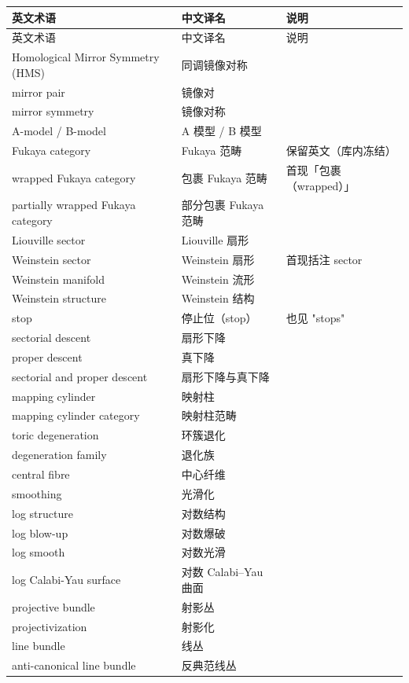 \documentclass[11pt,a4paper]{article}
\theoremstyle{cnth}
\begin{document}
{\small
\begin{longtable}{p{5.0cm}p{5.6cm}p{3.6cm}}
\toprule
英文术语 & 中文译名 & 说明 \\
\midrule
\endfirsthead
\toprule
英文术语 & 中文译名 & 说明 \\
\midrule
\endhead
\bottomrule
\endfoot
Homological Mirror Symmetry (HMS) & 同调镜像对称 &  \\
mirror pair & 镜像对 &  \\
mirror symmetry & 镜像对称 &  \\
A-model / B-model & A 模型 / B 模型 &  \\
Fukaya category & Fukaya 范畴 & 保留英文（库内冻结） \\
wrapped Fukaya category & 包裹 Fukaya 范畴 & 首现「包裹（wrapped）」 \\
partially wrapped Fukaya category & 部分包裹 Fukaya 范畴 &  \\
Liouville sector & Liouville 扇形 &  \\
Weinstein sector & Weinstein 扇形 & 首现括注 sector \\
Weinstein manifold & Weinstein 流形 &  \\
Weinstein structure & Weinstein 结构 &  \\
stop & 停止位（stop） & 也见 "stops" \\
sectorial descent & 扇形下降 &  \\
proper descent & 真下降 &  \\
sectorial and proper descent & 扇形下降与真下降 &  \\
mapping cylinder & 映射柱 &  \\
mapping cylinder category & 映射柱范畴 &  \\
toric degeneration & 环簇退化 &  \\
degeneration family & 退化族 &  \\
central fibre & 中心纤维 &  \\
smoothing & 光滑化 &  \\
log structure & 对数结构 &  \\
log blow-up & 对数爆破 &  \\
log smooth & 对数光滑 &  \\
log Calabi-Yau surface & 对数 Calabi–Yau 曲面 &  \\
projective bundle & 射影丛 &  \\
projectivization & 射影化 &  \\
line bundle & 线丛 &  \\
anti-canonical line bundle & 反典范线丛 &  \\

\end{longtable}}
\end{document}
